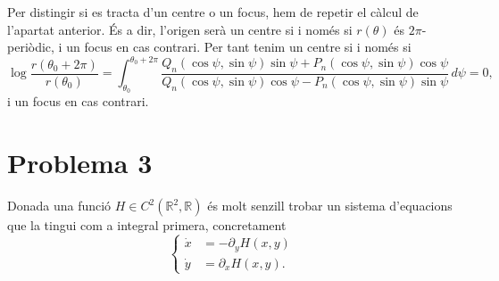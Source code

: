 \documentclass[12pt]{report}
\numberwithin{table}{section}
\numberwithin{equation}{section}
\numberwithin{figure}{section}
\newcommand{\R}{\mathbb{R}}
\begin{document}
\begin{enumerate}[label=(\roman*), font=\bfseries \sffamily, wide, labelwidth=!, labelindent=0pt]
		Per distingir si es tracta d'un centre o un focus, hem de repetir el càlcul de l'apartat anterior. És a dir, l'origen serà un centre si i només si \( r(\theta) \) és \( 2\pi \)-periòdic, i un focus en cas contrari. Per tant tenim un centre si i només si
		\begin{equation*}
			\log{\frac{r(\theta_0 + 2\pi)}{r(\theta_0)}} = \int_{\theta_0}^{\theta_0 + 2\pi} \frac{Q_n(\cos{\psi}, \sin{\psi}) \sin{\psi} + P_n(\cos{\psi}, \sin{\psi}) \cos{\psi}}{Q_n(\cos{\psi}, \sin{\psi}) \cos{\psi} - P_n(\cos{\psi}, \sin{\psi}) \sin{\psi}} \, d\psi = 0,
		\end{equation*}
	i un focus en cas contrari. 	

\end{enumerate}

\section*{Problema 3}
Donada una funció \( H \in C^2(\R^2, \R) \) és molt senzill trobar un sistema d'equacions que la tingui com a integral primera, concretament
\begin{equation*}
	\left\{ 
		\begin{aligned}
			\dot{x} & = -\partial_y H(x,y) \\
			\dot{y} & = \partial_x H(x,y).
		\end{aligned} 
	\right. 
\end{equation*}
\end{document}
